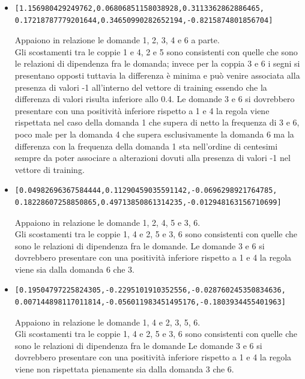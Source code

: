 \documentclass[10pt,a4paper]{article}
\begin{document}
\begin{itemize}
\item \begin{verbatim}[1.156980429249762,0.06806851158038928,0.3113362862886465,
0.17218787779201644,0.34650990282652194,-0.8215874801856704]\end{verbatim}
Appaiono in relazione le domande 1, 2, 3, 4  e 6 a parte.\\
Gli scostamenti tra le coppie  1 e 4, 2 e 5 sono consistenti con quelle che sono le relazioni di dipendenza fra le domanda; invece per la coppia 3 e 6 i segni si presentano opposti tuttavia la differenza \`e minima e pu\`o venire associata alla presenza di valori -1 all'interno del vettore di training essendo che la differenza di valori risulta inferiore allo 0.4.
Le domande 3 e 6 si dovrebbero presentare con una positivit\`a inferiore rispetto a 1 e 4 la regola viene rispettata nel caso della domanda 1 che supera di netto la frequenza di 3 e 6, poco male per la domanda 4 che supera esclusivamente la domanda 6 ma la differenza con la frequenza della domanda 1 sta nell'ordine di centesimi sempre da poter associare a alterazioni dovuti alla presenza di valori -1 nel vettore di training.

\item \begin{verbatim}[0.04982696367584444,0.11290459035591142,-0.0696298921764785, 0.18228607258850865,0.49713850861314235,-0.012948163156710699]\end{verbatim}
Appaiono in relazione le domande 1, 2, 4, 5 e 3, 6.\\
Gli scostamenti tra le coppie 1, 4 e 2, 5  e 3, 6 sono consistenti con quelle che sono le relazioni di dipendenza fra le domande.
Le domande 3 e 6 si dovrebbero presentare con una positivit\`a inferiore rispetto a 1 e 4 la regola viene sia dalla domanda 6 che 3.

\item \begin{verbatim}[0.19504797225824305,-0.2295101910352556,-0.028760245350834636,
0.007144898117011814,-0.056011983451495176,-0.1803934455401963]\end{verbatim}
Appaiono in relazione le domande 1, 4 e 2, 3, 5, 6.\\
Gli scostamenti tra le coppie 1, 4 e 2, 5 e 3, 6 sono consistenti con quelle che sono le relazioni di dipendenza fra le domande
Le domande 3 e 6 si dovrebbero presentare con una positivit\`a inferiore rispetto a 1 e 4 la regola viene non rispettata pienamente sia dalla domanda 3 che 6.


\end{itemize}
\end{document}
